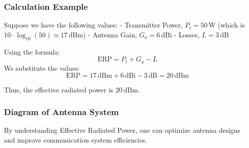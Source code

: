 \subsubsection{Calculation Example}

Suppose we have the following values:
- Transmitter Power, \( P_t = 50 \, \text{W} \) (which is \( 10 \cdot \log_{10}(50) \approx 17 \, \text{dBm} \))
- Antenna Gain, \( G_a = 6 \, \text{dBi} \)
- Losses, \( L = 3 \, \text{dB} \)

Using the formula:
\[
\text{ERP} = P_t + G_a - L
\]
We substitute the values:
\[
\text{ERP} = 17 \, \text{dBm} + 6 \, \text{dBi} - 3 \, \text{dB} = 20 \, \text{dBm}
\]

Thus, the effective radiated power is \( 20 \, \text{dBm} \).

\subsubsection{Diagram of Antenna System}

\begin{center}
\end{center}

By understanding Effective Radiated Power, one can optimize antenna designs and improve communication system efficiencies.
